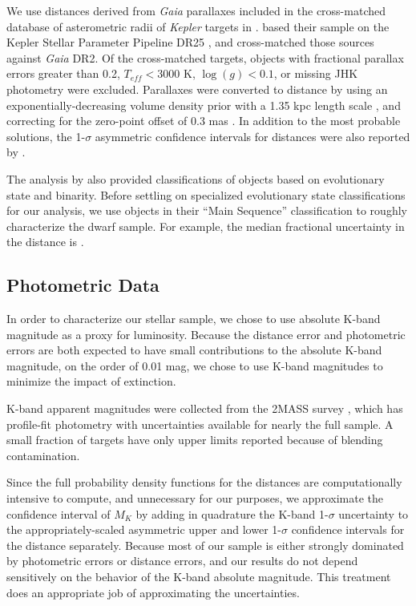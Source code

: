 \documentclass[manuscript]{aastex6}
\newcommand{\Kepler}{\mbox{\textit{Kepler}}}
\newcommand{\Gaia}{\mbox{\textit{Gaia}}}
\newcommand{\Teff}{\ensuremath{T_{eff}}}
\newcommand{\logg}{\ensuremath{\log(g)}}
\begin{document}
We use distances derived from \Gaia{} parallaxes included in the cross-matched
database of asterometric radii of \Kepler{} targets in \citet{Berger18b}.
\citet{Berger18b} based their sample on the Kepler Stellar Parameter Pipeline
DR25 \citep{Mathur17}, and cross-matched those sources against \Gaia{} DR2. Of
the cross-matched targets, objects with fractional parallax errors greater than
0.2, \(\Teff < 3000\) K, \(\logg < 0.1\), or missing JHK photometry were
excluded.  Parallaxes were converted to distance by using an
exponentially-decreasing volume density prior with a 1.35 kpc length scale
\citep{BailerJones15,Astraatmadja16}, and correcting for the zero-point offset
of 0.3 mas \citep{Lindegren18} . In addition to the most probable solutions, the
1-\(\sigma\) asymmetric confidence intervals for distances were also reported
by \citet{Berger18b}.

The analysis by \citep{Berger18b} also provided classifications of objects
based on evolutionary state and binarity. Before settling on specialized
evolutionary state classifications for our analysis, we use objects in their
``Main Sequence'' classification to roughly characterize the dwarf sample. For
example, the median fractional uncertainty in the distance is .

\subsection{Photometric Data}

In order to characterize our stellar sample, we chose to use absolute K-band
magnitude as a proxy for luminosity. Because the distance error and photometric
errors are both expected to have small contributions to the absolute K-band
magnitude, on the order of 0.01 mag, we chose to use K-band magnitudes to
minimize the impact of extinction.

K-band apparent magnitudes were collected from the 2MASS survey 
\citep{Skrutskie06}, which has profile-fit photometry with uncertainties 
available for nearly the full sample. A small fraction of targets have only 
upper limits reported because of blending contamination.

Since the full probability density functions for the distances are
computationally intensive to compute, and unnecessary for our purposes, we
approximate the confidence interval of \(M_K\) by adding in quadrature the 
K-band 1-\(\sigma\) uncertainty to the appropriately-scaled asymmetric upper 
and lower 1-\(\sigma\) confidence intervals for the distance separately. 
Because most of our sample is either strongly dominated by photometric errors 
or distance errors, and our results do not depend sensitively on the behavior 
of the K-band absolute magnitude. This treatment does an appropriate job of
approximating the uncertainties.
\end{document}
